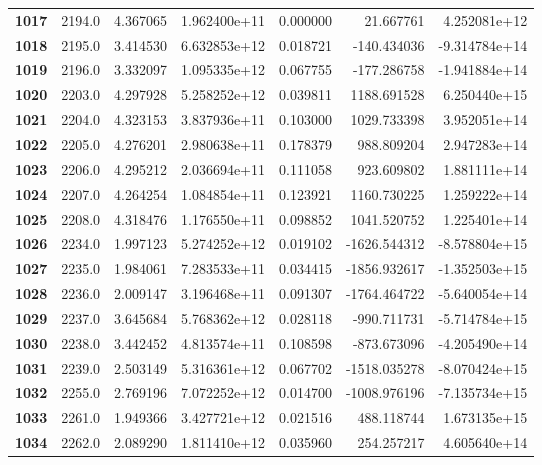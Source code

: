 \documentclass{report}[12pt]
\begin{document}
\begin{center}
\begin{tabular}{lrrrrrr}
\textbf{1017} &         2194.0 &   4.367065 &  1.962400e+11 &    0.000000 &    21.667761 &  4.252081e+12 \\
\textbf{1018} &         2195.0 &   3.414530 &  6.632853e+12 &    0.018721 &  -140.434036 & -9.314784e+14 \\
\textbf{1019} &         2196.0 &   3.332097 &  1.095335e+12 &    0.067755 &  -177.286758 & -1.941884e+14 \\
\textbf{1020} &         2203.0 &   4.297928 &  5.258252e+12 &    0.039811 &  1188.691528 &  6.250440e+15 \\
\textbf{1021} &         2204.0 &   4.323153 &  3.837936e+11 &    0.103000 &  1029.733398 &  3.952051e+14 \\
\textbf{1022} &         2205.0 &   4.276201 &  2.980638e+11 &    0.178379 &   988.809204 &  2.947283e+14 \\
\textbf{1023} &         2206.0 &   4.295212 &  2.036694e+11 &    0.111058 &   923.609802 &  1.881111e+14 \\
\textbf{1024} &         2207.0 &   4.264254 &  1.084854e+11 &    0.123921 &  1160.730225 &  1.259222e+14 \\
\textbf{1025} &         2208.0 &   4.318476 &  1.176550e+11 &    0.098852 &  1041.520752 &  1.225401e+14 \\
\textbf{1026} &         2234.0 &   1.997123 &  5.274252e+12 &    0.019102 & -1626.544312 & -8.578804e+15 \\
\textbf{1027} &         2235.0 &   1.984061 &  7.283533e+11 &    0.034415 & -1856.932617 & -1.352503e+15 \\
\textbf{1028} &         2236.0 &   2.009147 &  3.196468e+11 &    0.091307 & -1764.464722 & -5.640054e+14 \\
\textbf{1029} &         2237.0 &   3.645684 &  5.768362e+12 &    0.028118 &  -990.711731 & -5.714784e+15 \\
\textbf{1030} &         2238.0 &   3.442452 &  4.813574e+11 &    0.108598 &  -873.673096 & -4.205490e+14 \\
\textbf{1031} &         2239.0 &   2.503149 &  5.316361e+12 &    0.067702 & -1518.035278 & -8.070424e+15 \\
\textbf{1032} &         2255.0 &   2.769196 &  7.072252e+12 &    0.014700 & -1008.976196 & -7.135734e+15 \\
\textbf{1033} &         2261.0 &   1.949366 &  3.427721e+12 &    0.021516 &   488.118744 &  1.673135e+15 \\
\textbf{1034} &         2262.0 &   2.089290 &  1.811410e+12 &    0.035960 &   254.257217 &  4.605640e+14 \\

\end{tabular}
\end{center}
\end{document}
